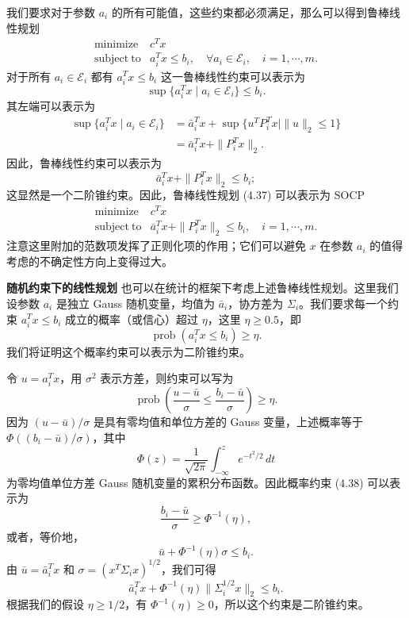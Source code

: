 \documentclass[UTF8,12pt,a4paper,fontset=fandol]{ctexart}
\begin{document}
我们要求对于参数 $a_i$ 的所有可能值，这些约束都必须满足，那么可以得到鲁棒线性规划
\begin{equation}
\begin{array}{ll}
\mathop{\mathrm{minimize}} & c^Tx\\
\mathrm{subject\ to} & a_i^Tx\leq b_i,\quad \forall a_i\in\mathcal{E}_i,\quad i=1,\cdots,m.
\end{array}
\tag{4.37}
\end{equation}
对于所有 $a_i\in\mathcal{E}_i$ 都有 $a_i^Tx\leq b_i$ 这一鲁棒线性约束可以表示为
\[
\sup\{a_i^Tx\mid a_i\in\mathcal{E}_i\}\leq b_i.
\]
其左端可以表示为
\[
\begin{aligned}
\sup\{a_i^Tx\mid a_i\in\mathcal{E}_i\}
&=\bar a_i^Tx+\sup\{u^TP_i^Tx\mid \|u\|_2\leq 1\}\\
&=\bar a_i^Tx+\|P_i^Tx\|_2.
\end{aligned}
\]
因此，鲁棒线性约束可以表示为
\[
\bar a_i^Tx+\|P_i^Tx\|_2\leq b_i;
\]
这显然是一个二阶锥约束。因此，鲁棒线性规划 (4.37) 可以表示为 SOCP
\[
\begin{array}{ll}
\mathop{\mathrm{minimize}} & c^Tx\\
\mathrm{subject\ to} & \bar a_i^Tx+\|P_i^Tx\|_2\leq b_i,\quad i=1,\cdots,m.
\end{array}
\]
注意这里附加的范数项发挥了正则化项的作用；它们可以避免 $x$ 在参数 $a_i$ 的值得考虑的不确定性方向上变得过大。

\noindent\textbf{随机约束下的线性规划}\quad
也可以在统计的框架下考虑上述鲁棒线性规划。这里我们设参数 $a_i$ 是独立 Gauss 随机变量，均值为 $\bar a_i$，协方差为 $\Sigma_i$。我们要求每一个约束 $a_i^Tx\leq b_i$ 成立的概率（或信心）超过 $\eta$，这里 $\eta\geq 0.5$，即
\begin{equation}
\operatorname{prob}(a_i^Tx\leq b_i)\geq \eta.
\tag{4.38}
\end{equation}
我们将证明这个概率约束可以表示为二阶锥约束。

令 $u=a_i^Tx$，用 $\sigma^2$ 表示方差，则约束可以写为
\[
\operatorname{prob}\left(\frac{u-\bar u}{\sigma}\leq \frac{b_i-\bar u}{\sigma}\right)\geq \eta.
\]
因为 $(u-\bar u)/\sigma$ 是具有零均值和单位方差的 Gauss 变量，上述概率等于 $\Phi((b_i-\bar u)/\sigma)$，其中
\[
\Phi(z)=\frac{1}{\sqrt{2\pi}}\int_{-\infty}^z e^{-t^2/2}\,dt
\]
为零均值单位方差 Gauss 随机变量的累积分布函数。因此概率约束 (4.38) 可以表示为
\[
\frac{b_i-\bar u}{\sigma}\geq \Phi^{-1}(\eta),
\]
或者，等价地，
\[
\bar u+\Phi^{-1}(\eta)\sigma\leq b_i.
\]
由 $\bar u=\bar a_i^Tx$ 和 $\sigma=(x^T\Sigma_i x)^{1/2}$，我们可得
\[
\bar a_i^Tx+\Phi^{-1}(\eta)\|\Sigma_i^{1/2}x\|_2\leq b_i.
\]
根据我们的假设 $\eta\geq 1/2$，有 $\Phi^{-1}(\eta)\geq 0$，所以这个约束是二阶锥约束。
\end{document}
